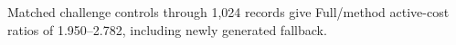 Matched challenge controls through 1,024 records give Full/method active-cost ratios of 1.950--2.782, including newly generated fallback.
